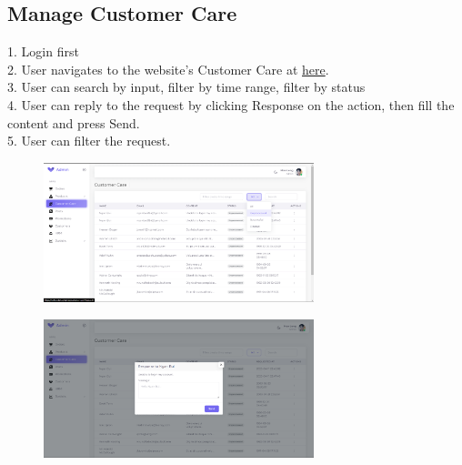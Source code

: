 \subsection{Manage Customer Care}
1. Login first \\
2. User navigates to the website's Customer Care at \href{https://coffee.skrt.cc/admin/customer-care}{here}. \\
3. User can search by input, filter by time range, filter by status\\
4. User can reply to the request by clicking Response on the action, then fill the content and press Send.\\
5. User can filter the request.\\
\begin{figure}[H]
    \centering
    \includegraphics[width=0.7\textwidth]{Demo/Screenshot_20.png}
    \label{fig:supportpage}
\end{figure}
\begin{figure}[H]
    \centering
    \includegraphics[width=0.7\textwidth]{Demo/Screenshot_21.png}
    \label{fig:supportpage}
\end{figure}

